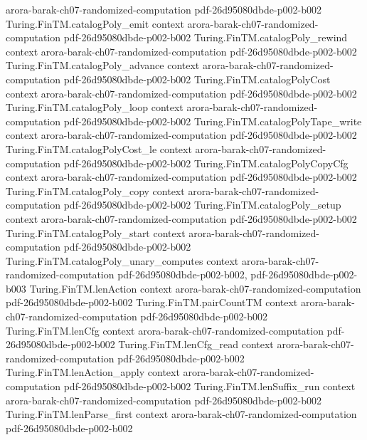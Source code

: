 \begin{theorem}
  {arora-barak-ch07-randomized-computation}
  {pdf-26d95080dbde-p002-b002}
\proofstep
  {Turing.FinTM.catalogPoly_emit}
  {context}
  {arora-barak-ch07-randomized-computation}
  {pdf-26d95080dbde-p002-b002}
\proofstep
  {Turing.FinTM.catalogPoly_rewind}
  {context}
  {arora-barak-ch07-randomized-computation}
  {pdf-26d95080dbde-p002-b002}
\proofstep
  {Turing.FinTM.catalogPoly_advance}
  {context}
  {arora-barak-ch07-randomized-computation}
  {pdf-26d95080dbde-p002-b002}
\proofstep
  {Turing.FinTM.catalogPolyCost}
  {context}
  {arora-barak-ch07-randomized-computation}
  {pdf-26d95080dbde-p002-b002}
\proofstep
  {Turing.FinTM.catalogPoly_loop}
  {context}
  {arora-barak-ch07-randomized-computation}
  {pdf-26d95080dbde-p002-b002}
\proofstep
  {Turing.FinTM.catalogPolyTape_write}
  {context}
  {arora-barak-ch07-randomized-computation}
  {pdf-26d95080dbde-p002-b002}
\proofstep
  {Turing.FinTM.catalogPolyCost_le}
  {context}
  {arora-barak-ch07-randomized-computation}
  {pdf-26d95080dbde-p002-b002}
\proofstep
  {Turing.FinTM.catalogPolyCopyCfg}
  {context}
  {arora-barak-ch07-randomized-computation}
  {pdf-26d95080dbde-p002-b002}
\proofstep
  {Turing.FinTM.catalogPoly_copy}
  {context}
  {arora-barak-ch07-randomized-computation}
  {pdf-26d95080dbde-p002-b002}
\proofstep
  {Turing.FinTM.catalogPoly_setup}
  {context}
  {arora-barak-ch07-randomized-computation}
  {pdf-26d95080dbde-p002-b002}
\proofstep
  {Turing.FinTM.catalogPoly_start}
  {context}
  {arora-barak-ch07-randomized-computation}
  {pdf-26d95080dbde-p002-b002}
\proofstep
  {Turing.FinTM.catalogPoly_unary_computes}
  {context}
  {arora-barak-ch07-randomized-computation}
  {pdf-26d95080dbde-p002-b002,
    pdf-26d95080dbde-p002-b003}
\proofstep
  {Turing.FinTM.lenAction}
  {context}
  {arora-barak-ch07-randomized-computation}
  {pdf-26d95080dbde-p002-b002}
\proofstep
  {Turing.FinTM.pairCountTM}
  {context}
  {arora-barak-ch07-randomized-computation}
  {pdf-26d95080dbde-p002-b002}
\proofstep
  {Turing.FinTM.lenCfg}
  {context}
  {arora-barak-ch07-randomized-computation}
  {pdf-26d95080dbde-p002-b002}
\proofstep
  {Turing.FinTM.lenCfg_read}
  {context}
  {arora-barak-ch07-randomized-computation}
  {pdf-26d95080dbde-p002-b002}
\proofstep
  {Turing.FinTM.lenAction_apply}
  {context}
  {arora-barak-ch07-randomized-computation}
  {pdf-26d95080dbde-p002-b002}
\proofstep
  {Turing.FinTM.lenSuffix_run}
  {context}
  {arora-barak-ch07-randomized-computation}
  {pdf-26d95080dbde-p002-b002}
\proofstep
  {Turing.FinTM.lenParse_first}
  {context}
  {arora-barak-ch07-randomized-computation}
  {pdf-26d95080dbde-p002-b002}

\end{theorem}

